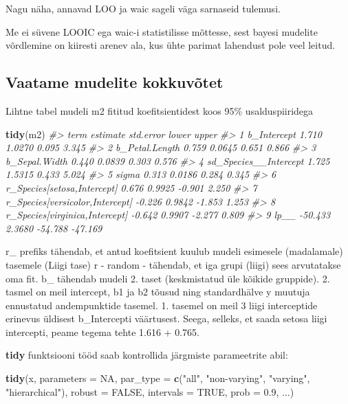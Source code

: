 \documentclass[]{book}
\newenvironment{Shaded}{\begin{snugshade}}{\end{snugshade}}
\newcommand{\CommentTok}[1]{\textcolor[rgb]{0.56,0.35,0.01}{\textit{#1}}}
\newcommand{\DataTypeTok}[1]{\textcolor[rgb]{0.13,0.29,0.53}{#1}}
\newcommand{\FloatTok}[1]{\textcolor[rgb]{0.00,0.00,0.81}{#1}}
\newcommand{\KeywordTok}[1]{\textcolor[rgb]{0.13,0.29,0.53}{\textbf{#1}}}
\newcommand{\NormalTok}[1]{#1}
\newcommand{\OtherTok}[1]{\textcolor[rgb]{0.56,0.35,0.01}{#1}}
\newcommand{\StringTok}[1]{\textcolor[rgb]{0.31,0.60,0.02}{#1}}
\begin{document}
Nagu näha, annavad LOO ja waic sageli väga sarnaseid tulemusi.

Me ei süvene LOOIC ega waic-i statistilisse mõttesse, sest bayesi mudelite võrdlemine on kiiresti arenev ala, kus ühte parimat lahendust pole veel leitud.

\hypertarget{vaatame-mudelite-kokkuvotet}{%
\subsection{Vaatame mudelite kokkuvõtet}\label{vaatame-mudelite-kokkuvotet}}

Lihtne tabel mudeli m2 fititud koefitsientidest koos 95\% usalduspiiridega

\begin{Shaded}
\begin{Highlighting}[]
\KeywordTok{tidy}\NormalTok{(m2)}
\CommentTok{#>                              term estimate std.error   lower   upper}
\CommentTok{#> 1                     b_Intercept    1.710    1.0270   0.095   3.345}
\CommentTok{#> 2                  b_Petal.Length    0.759    0.0645   0.651   0.866}
\CommentTok{#> 3                   b_Sepal.Width    0.440    0.0839   0.303   0.576}
\CommentTok{#> 4           sd_Species__Intercept    1.725    1.5315   0.433   5.024}
\CommentTok{#> 5                           sigma    0.313    0.0186   0.284   0.345}
\CommentTok{#> 6     r_Species[setosa,Intercept]    0.676    0.9925  -0.901   2.250}
\CommentTok{#> 7 r_Species[versicolor,Intercept]   -0.226    0.9842  -1.853   1.253}
\CommentTok{#> 8  r_Species[virginica,Intercept]   -0.642    0.9907  -2.277   0.809}
\CommentTok{#> 9                            lp__  -50.433    2.3680 -54.788 -47.169}
\end{Highlighting}
\end{Shaded}

r\_ prefiks tähendab, et antud koefitsient kuulub mudeli esimesele (madalamale) tasemele (Liigi tase) r - random - tähendab, et iga grupi (liigi) sees arvutatakse oma fit. b\_ tähendab mudeli 2. taset (keskmistatud üle kõikide gruppide). 2. tasmel on meil intercept, b1 ja b2 tõusud ning standardhälve y muutuja ennustatud andempunktide tasemel. 1. tasemel on meil 3 liigi interceptide erinevus üldisest b\_Intercepti väärtusest. Seega, selleks, et saada setosa liigi intercepti, peame tegema tehte 1.616 + 0.765.

\textbf{tidy} funktsiooni tööd saab kontrollida järgmiste parameetrite abil:

\begin{Shaded}
\begin{Highlighting}[]
\KeywordTok{tidy}\NormalTok{(x, }\DataTypeTok{parameters =} \OtherTok{NA}\NormalTok{, }\DataTypeTok{par_type =} \KeywordTok{c}\NormalTok{(}\StringTok{"all"}\NormalTok{,}
  \StringTok{"non-varying"}\NormalTok{, }\StringTok{"varying"}\NormalTok{, }\StringTok{"hierarchical"}\NormalTok{), }\DataTypeTok{robust =} \OtherTok{FALSE}\NormalTok{,}
  \DataTypeTok{intervals =} \OtherTok{TRUE}\NormalTok{, }\DataTypeTok{prob =} \FloatTok{0.9}\NormalTok{, ...)}
\end{Highlighting}
\end{Shaded}
\end{document}
